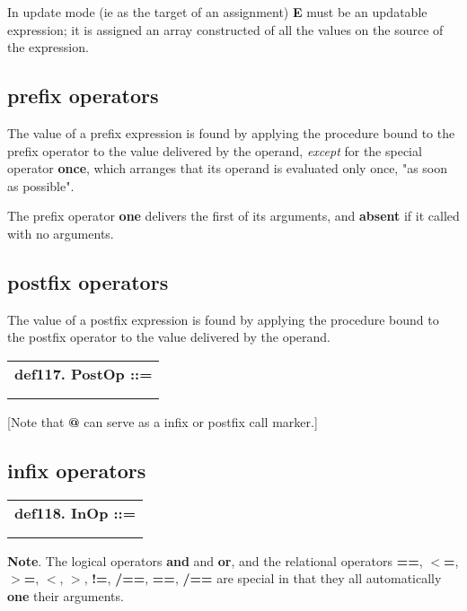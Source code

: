\documentclass{report}
\begin{document}
In update mode (ie as the target of an assignment) {\bf E} must be an
updatable expression; it is assigned an array constructed of all the
values on the source of the expression.\subsection{prefix operators}


The value of a prefix expression is found by applying the procedure
bound to the prefix operator to the value delivered by the operand,
{\em except} for the special operator {\bf once}, which arranges that its
operand is evaluated only once, "as soon as possible".

The prefix operator {\bf one} delivers the first of its arguments, and
{\bf absent} if it called with no arguments.\subsection{postfix operators}


The value of a postfix expression is found by applying the procedure
bound to the postfix operator to the value delivered by the operand.

\begin{tabular}{l}
{\bf def117. PostOp ::= }\\ 
\hspace*{3mm}{\tt LexicalPostfixOperator} \\ 
\hspace*{3mm}{\tt  $\mid$ "@" DotExpr} \\ 
\end{tabular}

{[}Note that {\bf @} can serve as a infix or postfix call marker.{]}\subsection{infix operators}


\begin{tabular}{l}
{\bf def118. InOp ::= }\\ 
\hspace*{3mm}{\tt LexicalInfixOperator} \\ 
\hspace*{3mm}{\tt  $\mid$ "@" DotExpr} \\ 
\end{tabular}

{\bf Note}. The logical operators {\bf and} and {\bf or}, and the relational operators
{\bf ==}, {\bf $<$=}, {\bf $>$=}, {\bf $<$}, {\bf $>$}, {\bf !=}, {\bf /==}, {\bf ==}, {\bf /==} are special in that
they all automatically {\bf one} their arguments.
\end{document}
